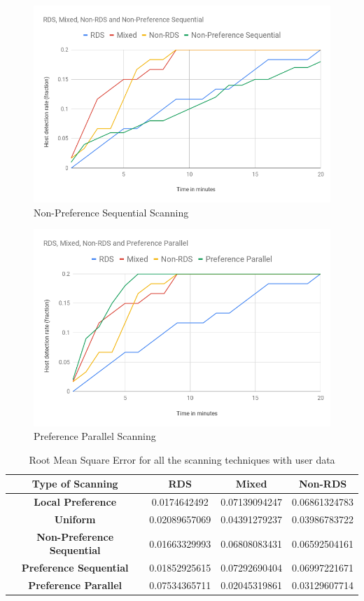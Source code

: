 \FloatBarrier
\begin{figure}[!htbp]
\centering
  \includegraphics[scale=0.7]{Chap5/nonpref.png}  \caption{Non-Preference Sequential Scanning}\label{fig:figure25}
\end{figure}
\FloatBarrier
\begin{figure}[!htbp]
\centering
  \includegraphics[scale=0.7]{Chap5/prefpar.png}  \caption{Preference Parallel Scanning}\label{fig:figure26}
\end{figure}

\bgroup
\def\arraystretch{1.5}
\begin{table}[]
\centering
\begin{tabular}{|c|c|c|c|}
\hline
\textbf{Type of Scanning} & \textbf{RDS} & \textbf{Mixed} & \textbf{Non-RDS} \\
\hline
\textbf{Local Preference} & 0.0174642492  & 0.07139094247 & 0.06861324783 \\ \hline
\textbf{Uniform} & 0.02089657069 & 0.04391279237 & 0.03986783722 \\ \hline
\textbf{Non-Preference Sequential} & 0.01663329993 & 0.06808083431 & 0.06592504161 \\ \hline
\textbf{Preference Sequential} & 0.01852925615 & 0.07292690404 & 0.06997221671 \\ \hline
\textbf{Preference Parallel} & 0.07534365711 & 0.02045319861 & 0.03129607714 \\ \hline
\end{tabular}
\caption{ Root Mean Square Error for all the scanning techniques with user data}
\label{tab:my-table}
\end{table}
\egroup

\clearpage
